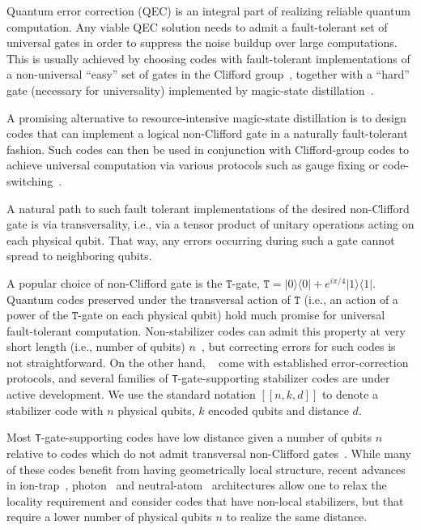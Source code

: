 \documentclass[journal]{IEEEtran}
\newcommand{\T}{\texttt{T}}
\begin{document}
Quantum error correction (QEC) is an integral part of realizing reliable quantum computation. Any viable QEC solution needs to admit a fault-tolerant set of universal gates in order to suppress the noise buildup over large computations. This is usually achieved by choosing codes with fault-tolerant implementations of a non-universal ``easy'' set of gates in the Clifford group~\cite{bombin_topological_2006,gottesman_quantum_2016,katzgraber_topological_2010,yoder_surface_2017,koutsioumpas_smallest_2022,vasmer_morphing_2022}, together with a ``hard'' gate (necessary for universality) implemented by magic-state distillation~\cite{bravyi_universal_2005,campbell_roads_2017}. 

A promising alternative to resource-intensive magic-state distillation is to design codes that can implement a logical non-Clifford gate in a naturally fault-tolerant fashion.
Such codes can then be used in conjunction with Clifford-group codes to achieve universal computation via various protocols such as gauge fixing or code-switching~\cite{gong_computation_2024, heusen_efficient_2024,paetznick_universal_2013, bombin_gauge_2015, yoder_universal_2016, sullivan_code_2024,anderson_fault-tolerant_2014, jochym-oconnor_fault-tolerant_2019}.

A natural path to such fault tolerant implementations of the desired non-Clifford gate is via transversality, i.e., via a tensor product of unitary operations acting on each physical qubit.
That way, any errors occurring during such a gate cannot spread to neighboring qubits.

A popular choice of non-Clifford gate is the $\texttt{T}$-gate, $\texttt{T}=|0\rangle\langle 0|+e^{i \pi/4}|1\rangle\langle 1|$. 
Quantum codes preserved under the transversal action of $\texttt{T}$ (i.e., an action of a power of the $\texttt{T}$-gate on each physical qubit) hold much promise for universal fault-tolerant computation.
Non-stabilizer codes can admit this property at very short length (i.e., number of qubits) \(n\)~\cite{kubischta_not-so-secret_2024}, but correcting errors for such codes is not straightforward.
On the other hand, ~\cite{gottesman_stabilizer_1997,calderbank_quantum_1997} come with established error-correction protocols, and several families of \T-gate-supporting stabilizer codes are under active development. We use the standard notation $[[n,k,d]]$ to denote a stabilizer code with $n$ physical qubits, $k$ encoded qubits and distance $d$.

Most \T-gate-supporting codes have low distance given a number of qubits \(n\) relative to codes which do not admit transversal non-Clifford gates~\cite{grassl_markus_bounds_2007}.
While many of these codes benefit from having geometrically local structure, recent advances in ion-trap~\cite{monroe_scaling_2013}, photon~\cite{rudolph_why_2017} and neutral-atom~\cite{bluvstein_logical_2024} architectures allow one to relax the locality requirement and consider codes that have non-local stabilizers, but that require a lower number of physical qubits \(n\) to realize the same distance. 
\end{document}

